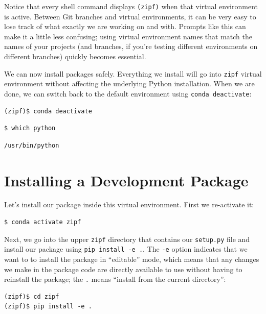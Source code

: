 \documentclass[
]{krantz}
\begin{document}
Notice that every shell command displays \texttt{(zipf)} when that virtual environment is active.
Between Git branches and virtual environments,
it can be very easy to lose track of what exactly we are working on and with.
Prompts like this can make it a little less confusing;
using virtual environment names that match the names of your projects
(and branches, if you're testing different environments on different branches)
quickly becomes essential.

We can now install packages safely.
Everything we install will go into \texttt{zipf} virtual environment
without affecting the underlying Python installation.
When we are done,
we can switch back to the default environment using \texttt{conda\ deactivate}:

\begin{verbatim}
(zipf)$ conda deactivate
\end{verbatim}

\begin{verbatim}
$ which python
\end{verbatim}

\begin{verbatim}
/usr/bin/python
\end{verbatim}

\hypertarget{packaging-installing}{%
\section{Installing a Development Package}\label{packaging-installing}}

Let's install our package inside this virtual environment.
First we re-activate it:

\begin{verbatim}
$ conda activate zipf
\end{verbatim}

Next,
we go into the upper \texttt{zipf} directory that contains our \texttt{setup.py} file
and install our package using \texttt{pip\ install\ -e\ .}.
The \texttt{-e} option indicates that we want to to install the package in ``editable'' mode,
which means that any changes we make in the package code are directly available to use
without having to reinstall the package;
the \texttt{.} means ``install from the current directory'':

\begin{verbatim}
(zipf)$ cd zipf
(zipf)$ pip install -e .
\end{verbatim}
\end{document}

